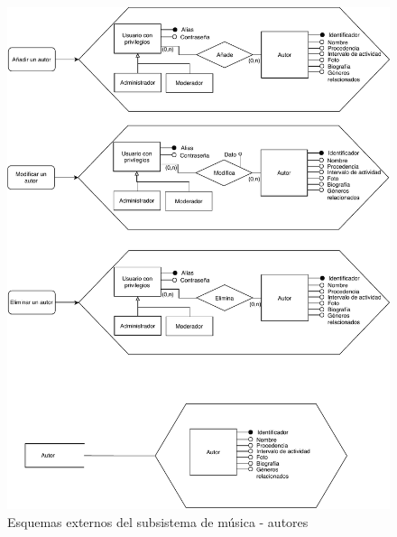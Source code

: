\begin{figure}[H]
  \caption{Esquemas externos del subsistema de música - autores}
  \centering
  \includegraphics[scale=0.7]{diagramas/musica-externo-autor.pdf}
\end{figure}

